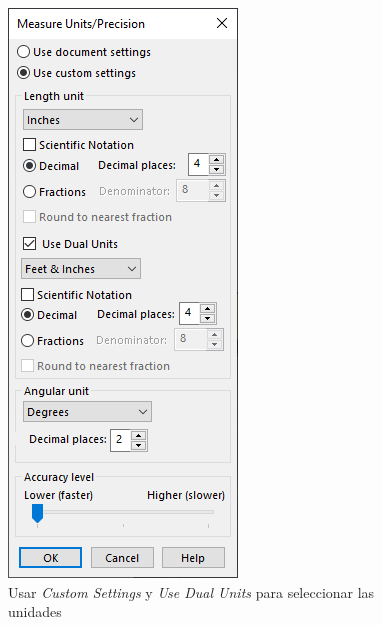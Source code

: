 \documentclass[12pt,letterpaper,final]{report}
\begin{document}
\begin{figure}[H]
	\centering
	\includegraphics[width=0.85\linewidth, height=0.5\textheight,keepaspectratio]{Imagenes/solidworks_dual_units02}
	\caption{Usar \emph{Custom Settings} y \emph{Use Dual Units} para seleccionar las unidades}
	\label{fig:solidworksdualunits02}
\end{figure}
\end{document}
